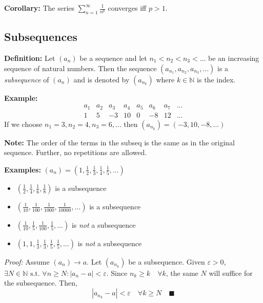 \documentclass[12pt]{report}
\newcommand{\N}{\mathbb{N}}
\newcommand{\qed}{\quad \blacksquare}
\newcommand{\abs}[1]{\left\vert #1 \right\vert}
\newcommand{\st}{\text{ s.t. }}
\newcommand{\ep}{\varepsilon}
\newenvironment*{tbox}[2][gray]{
    \begin{tcolorbox}[
        parbox=false,
        colback=#1!5!white,
        colframe=#1!75!black,
        breakable,
        title={#2}
    ]}
    {\end{tcolorbox}}
\begin{document}
    \textbf{Corollary:} The series $\sum_{n=1}^{\infty} \frac{1}{n^p}$ converges iff $p > 1$.

    \subsection*{Subsequences}
        \textbf{Definition:} Let $(a_n)$ be a sequence and let $n_1 < n_2 < n_3 < \dots$ be an increasing sequence of natural numbers. Then the sequence $(a_{n_1}, a_{n_2}, a_{n_3}, \dots)$ is a \emph{subsequence} of $(a_n)$ and is denoted by $(a_{n_k})$ where $k \in \N$ is the index.

        \textbf{Example:} 
        \[\begin{array}{c|ccccccccc}
            a_1 & a_2 & a_3 & a_4 & a_5 & a_6 & a_7 & \dots\\
            \hline
            1 & 5 & -3 & 10 & 0 & -8 & 12 & \dots
        \end{array}\]
        If we choose $n_1 = 3, n_2 = 4, n_3 = 6, \dots$ then $(a_{n_k}) = (-3, 10, -8, \dots)$

        \textbf{Note:} The order of the terms in the subseq is the same as in the original sequence. Further, no repetitions are allowed. 

        \textbf{Examples:} $(a_n) = (1, \frac{1}{2}, \frac{1}{3}, \frac{1}{4}, \frac{1}{5}, \dots)$
        \begin{itemize}
            \item $(\frac{1}{2}, \frac{1}{4}, \frac{1}{6}, \frac{1}{8})$ is a subsequence
            \item $(\frac{1}{10}, \frac{1}{100}, \frac{1}{1000}, \frac{1}{10000}, \dots)$ is a subsequence 
            \item $(\frac{1}{10}, \frac{1}{5}, \frac{1}{100}, \frac{1}{5}, \dots)$ is \emph{not} a subsequence
            \item $(1, 1, \frac{1}{3}, \frac{1}{3}, \frac{1}{5}, \frac{1}{5}, \dots)$ is \emph{not} a subsequence
        \end{itemize}

        \begin{tbox}{\textbf{Theorem:} A subsequence of a convergent sequence converges to the same limit as the original sequence}
            \emph{Proof:} Assume $(a_n) \to a$. Let $(a_{n_k})$ be a subsequence. Given $\ep > 0$, $\exists N \in \N \st \forall n \geq N: \abs{a_n - a} < \ep$. Since $n_k \geq k \quad \forall k$, the same $N$ will suffice for the subsequence. Then, 
            \[\abs{a_{n_k} - a} < \ep \quad \forall k \geq N\qed\]
        \end{tbox}
\end{document}
